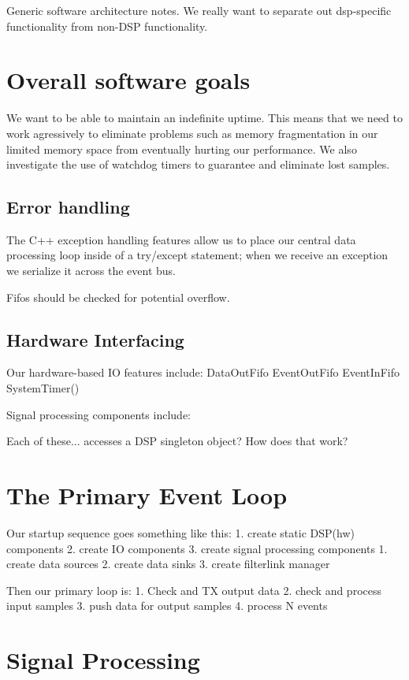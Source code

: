 Generic software architecture notes. We really want to separate out
dsp-specific functionality from non-DSP functionality.

\section{Overall software goals}
We want to be able to maintain an indefinite uptime. This means that
we need to work agressively to eliminate problems such as memory
fragmentation in our limited memory space from eventually hurting our
performance. We also investigate the use of watchdog timers to
guarantee and eliminate lost samples.

\subsection{Error handling}
The C++ exception handling features allow us to place our central data
processing loop inside of a try/except statement; when we receive an
exception we serialize it across the event bus.

Fifos should be checked for potential overflow. 

\subsection{Hardware Interfacing}
Our hardware-based IO features include: 
DataOutFifo
EventOutFifo
EventInFifo
SystemTimer()

Signal processing components include: 

Each of these... accesses a DSP singleton object? How does that work? 

\section{The Primary Event Loop}

Our startup sequence goes something like this: 
1. create static DSP(hw) components
2. create IO components
3. create signal processing components
    1. create data sources
    2. create data sinks
    3. create filterlink manager

Then our primary loop is: 
   1. Check and TX output data
   2. check and process input samples
   3. push data for output samples
   4. process N events


\section{Signal Processing}

